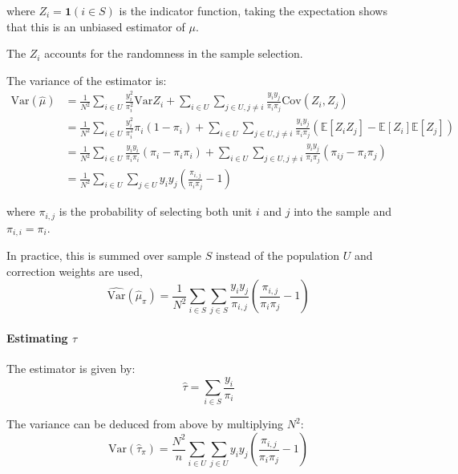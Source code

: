 \documentclass{article}
\begin{document}
where $Z_i=\mathbf{1}(i\in S)$ is the indicator function, taking the expectation shows that this is an unbiased estimator of $\mu$.    

\begin{remark}
    The $Z_i$ accounts for the randomness in the sample selection.
\end{remark}

The variance of the estimator is:
\begin{align*}
    \mathrm{Var}(\hat{\mu}) &=  \frac{1}{N^2} \sum_{i\in U}\frac{y_{i}^{2}}{\pi_{i}^{2}}\mathrm{Var}Z_{i}+\sum_{i\in U}\sum_{j\in U,j\neq i}\frac{y_{i}y_{j}}{\pi_{i}\pi_{j}}\mathrm{Cov}(Z_{i},Z_{j})\\
    &= \frac{1}{N^2} \sum_{i\in U}\frac{y_{i}^{2}}{\pi_{i}^{2}}\pi_i(1-\pi_i)+\sum_{i\in U}\sum_{j\in U,j\neq i}\frac{y_{i}y_{j}}{\pi_{i}\pi_{j}}(\mathbb{E}[Z_iZ_j]-\mathbb{E}[Z_i]\mathbb{E}[Z_j])\\
    &=\frac{1}{N^2} \sum_{i\in U}\frac{y_{i}y_i}{\pi_{i}\pi_i}(\pi_i-\pi_i\pi_i)+\sum_{i\in U}\sum_{j\in U,j\neq i}\frac{y_{i}y_{j}}{\pi_{i}\pi_{j}}(\pi_{ij} - \pi_i \pi_j)\\
    &=\frac{1}{N^2}\sum_{i\in U}\sum_{j\in U}y_{i}y_{j}\left({\frac{\pi_{i,j}}{\pi_{i}\pi_{j}}}-1\right)
\end{align*}

where $\pi_{i,j}$ is the probability of selecting both unit $i$ and $j$ into the sample and  $\pi_{i,i}=\pi_{i}$. 

In practice, this is summed over sample $S$ instead of the population $U$ and correction weights are used, 
\begin{equation}
    \widehat{\mathrm{Var}}\left(\hat{\mu}_{\pi}\right)=\frac{1}{N^2}\sum_{i\in S}\sum_{j\in S}\frac{y_{i}y_{j}}{\pi_{i,j}}\left(\frac{\pi_{i,j}}{\pi_{i}\pi_{j}}-1\right)
\end{equation}

\paragraph{Estimating $\tau$} The estimator is given by:
\begin{equation}\label{eq:horvitz_thompson_total}
    \hat{\tau} = \sum_{i\in S} \frac{y_i}{\pi_i}
\end{equation}

The variance can be deduced from above by multiplying $N^2$:
\begin{equation}\label{eq:var_horvitz_thompson_total}
    \mathrm{Var}(\hat{\tau}_{\pi}) = \frac{N^2}{n}\sum_{i\in U}\sum_{j\in U}y_{i}y_{j}\left(\frac{\pi_{i,j}}{\pi_{i}\pi_{j}}-1\right)
\end{equation}
\end{document}
